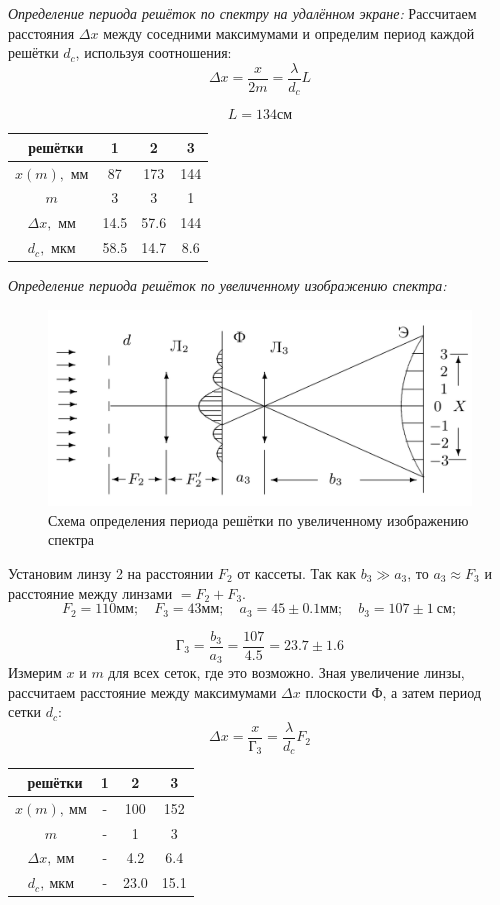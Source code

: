 \documentclass[a4paper, 12pt]{article}%
\newcommand{\RomanNumeralCaps}[1]{\uppercase\expandafter{\romannumeral#1}}
\begin{document}
	
	\RomanNumeralCaps 3 \textit{Определение периода решёток по спектру на удалённом экране:}
	Рассчитаем расстояния $\Delta x$ между соседними максимумами и определим период каждой решётки $d_c$, используя соотношения:
	\[
	\Delta x = \frac{x}{2 m} = \frac{\lambda}{d_c} L
	\]
	
	\[
	L = 134 \text{см}
	\]
	\begin{table}[H]
		\centering
		\begin{tabular}{|c|c|c|c|}  \hline
			\textnumero\ решётки & 1 & 2 & 3 \\\hline
			$x(m),$ мм & 87 & 173 & 144 \\\hline
			$m$ & 3 & 3 & 1 \\\hline
			$\Delta x,$ мм & 14.5 & 57.6 & 144 \\\hline
			$d_c,$ мкм & 58.5 & 14.7 & 8.6  \\\hline
		\end{tabular}
	\end{table}



\RomanNumeralCaps 4 \textit{Определение периода решёток по увеличенному изображению спектра:}
	
	\begin{figure}[H]
		\begin{center}
		\includegraphics[width = 0.6\linewidth]{3.png}
		\caption{Схема определения периода решётки по увеличенному изображению спектра}
		\end{center}
	\end{figure}
	Установим линзу 2 на расстоянии $F_2$ от кассеты. Так как $b_3 \gg a_3$, то $a_3 \approx F_3$ и расстояние между линзами $= F_2 + F_3$. 
	\[
	F_2 = 110\text{мм}; \quad F_3 = 43 \text{мм}; \quad a_3 = 45 \pm 0.1 \text{мм}; \quad b_3 = 107 \pm 1\ \text{см};
	\]
	
	\[
	\text{Г}_3 = \frac{b_3}{a_3} = \frac{107}{4.5} = 23.7 \pm 1.6
	\]
	Измерим $x$ и $m$ для всех сеток, где это возможно. Зная увеличение линзы, рассчитаем расстояние между максимумами $\Delta x$ плоскости Ф, а затем период сетки $d_c$:
	\[
	\Delta x = \frac{x}{\text{Г}_3} = \frac{\lambda}{d_c} F_2
	\]
	\begin{table}[H]
		\centering
		\begin{tabular}{|c|c|c|c|}  \hline
			\textnumero\ решётки & 1 & 2 & 3  \\\hline
			$x(m),\ мм$ & - & 100 & 152  \\\hline
			$m$ & - & 1 & 3  \\\hline
			$\Delta x,\ мм$ & - & 4.2 & 6.4  \\\hline
			$d_c,\ мкм$  & - & 23.0 & 15.1  \\\hline
		\end{tabular}
	\end{table}
\end{document}
